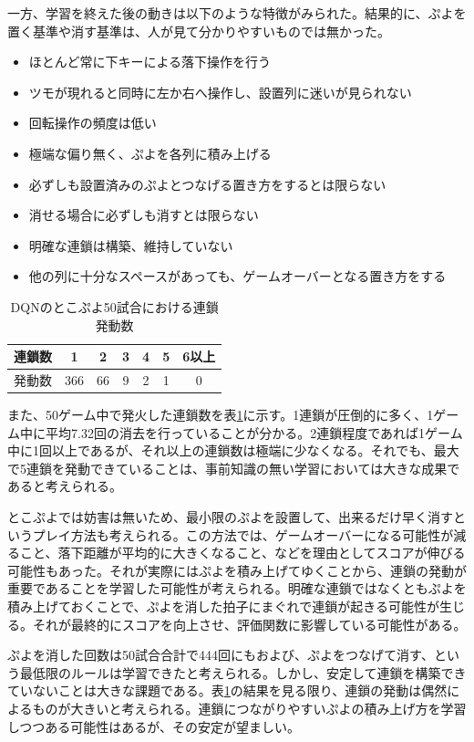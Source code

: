 \documentclass[12pt]{jreport}
\begin{document}
一方、学習を終えた後の動きは以下のような特徴がみられた。結果的に、ぷよを置く基準や消す基準は、人が見て分かりやすいものでは無かった。
\begin{itemize}
  \item ほとんど常に下キーによる落下操作を行う
  \item ツモが現れると同時に左か右へ操作し、設置列に迷いが見られない
  \item 回転操作の頻度は低い
  \item 極端な偏り無く、ぷよを各列に積み上げる
  \item 必ずしも設置済みのぷよとつなげる置き方をするとは限らない
  \item 消せる場合に必ずしも消すとは限らない
  \item 明確な連鎖は構築、維持していない
  \item 他の列に十分なスペースがあっても、ゲームオーバーとなる置き方をする
\end{itemize}

\begin{table}[tb]
\begin{center}
\caption{DQNのとこぷよ50試合における連鎖発動数} \label{tab:dqn_chain_tokopuyo}
\begin{tabular}{|l|c|c|c|c|c|c|} \hline
連鎖数 & 1 & 2 & 3 & 4 & 5 & 6以上\\ \hline
発動数 & 366 & 66 & 9 & 2 & 1 & 0\\ \hline
\end{tabular}
\end{center}
\end{table}

また、50ゲーム中で発火した連鎖数を表\ref{tab:dqn_chain_tokopuyo}に示す。1連鎖が圧倒的に多く、1ゲーム中に平均7.32回の消去を行っていることが分かる。2連鎖程度であれば1ゲーム中に1回以上であるが、それ以上の連鎖数は極端に少なくなる。それでも、最大で5連鎖を発動できていることは、事前知識の無い学習においては大きな成果であると考えられる。

とこぷよでは妨害は無いため、最小限のぷよを設置して、出来るだけ早く消すというプレイ方法も考えられる。この方法では、ゲームオーバーになる可能性が減ること、落下距離が平均的に大きくなること、などを理由としてスコアが伸びる可能性もあった。それが実際にはぷよを積み上げてゆくことから、連鎖の発動が重要であることを学習した可能性が考えられる。明確な連鎖ではなくともぷよを積み上げておくことで、ぷよを消した拍子にまぐれで連鎖が起きる可能性が生じる。それが最終的にスコアを向上させ、評価関数に影響している可能性がある。

ぷよを消した回数は50試合合計で444回にもおよび、ぷよをつなげて消す、という最低限のルールは学習できたと考えられる。しかし、安定して連鎖を構築できていないことは大きな課題である。表\ref{tab:dqn_chain_tokopuyo}の結果を見る限り、連鎖の発動は偶然によるものが大きいと考えられる。連鎖につながりやすいぷよの積み上げ方を学習しつつある可能性はあるが、その安定が望ましい。
\end{document}
